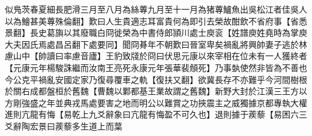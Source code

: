 似鳬茨春夏細長肥滑三月至八月為絲蓴九月至十一月為猪蓴鱸魚出吳松江者佳吳人以為鱠甚美蓴殊倫翻】歎曰人生貴適志耳富貴何為即引去榮故酣飲不省府事【省悉景翻】長史葛旟以其廢職白冏徙榮為中書侍郎頴川處士庾衮【姓譜庾姓堯時為掌庾大夫因氏焉處昌呂翻下處要同】聞冏朞年不朝歎曰晉室卑矣禍亂將興帥妻子逃於林慮山中【帥讀曰率慮音廬】王豹致牋於冏曰伏思元康以來宰相在位未有一人獲終者【元康元年楊駿誅繼而汝南王亮死永康元年張華裴頠死】乃事埶使然非皆為不善也今公克平禍亂安國定家乃復尋覆車之軌【復扶又翻】欲冀長存不亦難乎今河間樹根於關右成都盤桓於舊魏【曹魏以鄴都基王業故謂之舊魏】新野大封於江漢三王方以方剛強盛之年並典戎馬處要害之地而明公以難賞之功挾震主之威獨據京都專執大權進則亢龍有悔【易乾上九爻辭象曰亢龍有悔盈不可久也】退則據于蒺藜【易困六三爻辭陶宏景曰蒺藜多生道上而葉